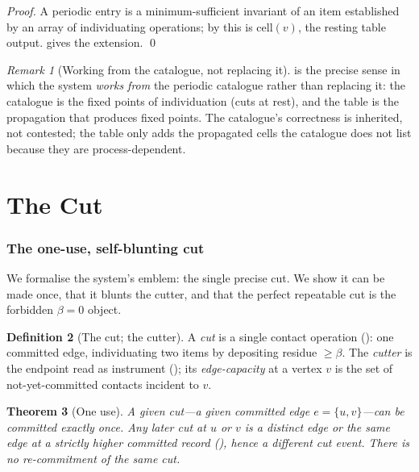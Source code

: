 \documentclass[11pt,twocolumn,a4paper]{article}
\theoremstyle{thmstyle}
\newtheorem{theorem}{Theorem}[section]
\theoremstyle{definition}
\newtheorem{definition}[theorem]{Definition}
\theoremstyle{remark}
\newtheorem{remark}[theorem]{Remark}
\newcommand{\flo}{\beta}                 %
\begin{document}
\begin{proof}
A periodic entry is a minimum-sufficient invariant of an item established
by an array of individuating operations; by  this
is $\mathrm{cell}(v)$, the resting table output. 
gives the extension. \qed
\end{proof}

\begin{remark}[Working from the catalogue, not replacing it]
\label{rem:from-catalogue}
 is the precise sense in which the system \emph{works
from} the periodic catalogue rather than replacing it: the catalogue is the
fixed points of individuation (cuts at rest), and the table is the
propagation that produces fixed points. The catalogue's correctness is
inherited, not contested; the table only adds the propagated cells the
catalogue does not list because they are process-dependent.
\end{remark}

\part{The Cut}

\section{The one-use, self-blunting cut}
\label{sec:cut}

We formalise the system's emblem: the single precise cut. We show it can
be made once, that it blunts the cutter, and that the perfect repeatable
cut is the forbidden $\flo=0$ object.

\begin{definition}[The cut; the cutter]
\label{def:thecut}
A \emph{cut} is a single contact operation (): one
committed edge, individuating two items by depositing residue $\ge\flo$.
The \emph{cutter} is the endpoint read as instrument
(); its \emph{edge-capacity} at a vertex $v$ is the set
of not-yet-committed contacts incident to $v$.
\end{definition}

\begin{theorem}[One use]
\label{thm:one-use}
A given cut---a given committed edge $e=\{u,v\}$---can be committed exactly
once. Any later cut at $u$ or $v$ is a distinct edge or the same edge at a
strictly higher committed record (), hence a different
cut event. There is no re-commitment of the same cut.
\end{theorem}
\end{document}
